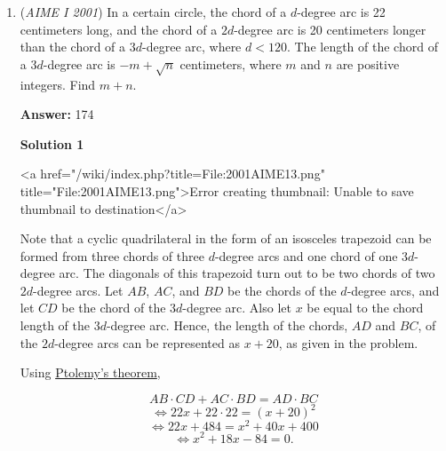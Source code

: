 \begin{enumerate}
 Next, we find the total surface area as the sum of the areas of the four triangular faces:
 \[\text{Surface Area} = [ABD] + [BDC] + [ACD] + [ABC] = 12 + 4 + 6 + [ABC]\]

 The side lengths of triangle $ABC$ are $\sqrt{52}$, $\sqrt{40}$, and $\sqrt{20}$. Constructing an altitude from $A$ and using the system of equations $x^2 + h^2 = 40$ and $(2\sqrt{5} - x)^2 + h^2 = 20$, we solve for $h$ and get:
 \[h = \frac{14\sqrt{5}}{5}\]

 Thus, the area of triangle $ABC$ is:
 \[\text{Area of } [ABC] = 14\]

 Now, the total surface area is:
 \[A = 12 + 4 + 6 + 14 = 36\]Finally, using the formula for the radius, we have:
 \[r = \frac{3 \times 8}{36} = \frac{2}{3}\]$\boxed{005}$



	\item (\textit{AIME I 2001}) In a certain circle, the chord of a $d$-degree arc is 22 centimeters long, and the chord of a $2d$-degree arc is 20 centimeters longer than the chord of a $3d$-degree arc, where $d < 120.$  The length of the chord of a $3d$-degree arc is $- m + \sqrt {n}$ centimeters, where $m$ and $n$ are positive integers.  Find $m + n.$

 \textbf{Answer: }174



\textbf{Solution 1}

<a href="/wiki/index.php?title=File:2001AIME13.png" title="File:2001AIME13.png">Error creating thumbnail: Unable to save thumbnail to destination</a>

 Note that a cyclic quadrilateral in the form of an isosceles trapezoid can be formed from three chords of three $d$-degree arcs and one chord of one $3d$-degree arc. The diagonals of this trapezoid turn out to be two chords of two $2d$-degree arcs. Let $AB$, $AC$, and $BD$ be the chords of the $d$-degree arcs, and let $CD$ be the chord of the $3d$-degree arc. Also let $x$ be equal to the chord length of the $3d$-degree arc. Hence, the length of the chords, $AD$ and $BC$, of the $2d$-degree arcs can be represented as $x + 20$, as given in the problem. 

 Using \href{https://artofproblemsolving.com/wiki/index.php?title=Ptolemy\%27s\_theorem}{Ptolemy's theorem},

 
 \[AB \cdot CD + AC \cdot BD = AD \cdot BC\]
 \[\iff 22x + 22 \cdot 22  = (x + 20)^2\]
 \[\iff 22x + 484 = x^2 + 40x + 400\]
 \[\iff x^2 + 18x - 84 = 0.\]


\end{enumerate}
